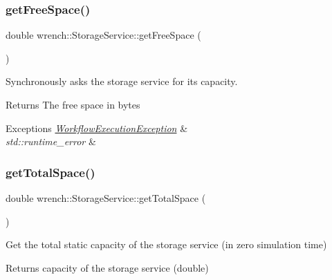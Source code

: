 \subsubsection{\texorpdfstring{get\+Free\+Space()}{getFreeSpace()}}
{\footnotesize\ttfamily double wrench\+::\+Storage\+Service\+::get\+Free\+Space (\begin{DoxyParamCaption}{ }\end{DoxyParamCaption})\hspace{0.3cm}{\ttfamily [virtual]}}



Synchronously asks the storage service for its capacity. 

\begin{DoxyReturn}{Returns}
The free space in bytes
\end{DoxyReturn}

\begin{DoxyExceptions}{Exceptions}
{\em \hyperlink{classwrench_1_1_workflow_execution_exception}{Workflow\+Execution\+Exception}} & \\
\hline
{\em std\+::runtime\+\_\+error} & \\
\hline
\end{DoxyExceptions}
\mbox{\label{classwrench_1_1_storage_service_a0ea24bcd9b320bde776b64dd8e4cd494}} 
\subsubsection{\texorpdfstring{get\+Total\+Space()}{getTotalSpace()}}
{\footnotesize\ttfamily double wrench\+::\+Storage\+Service\+::get\+Total\+Space (\begin{DoxyParamCaption}{ }\end{DoxyParamCaption})}



Get the total static capacity of the storage service (in zero simulation time) 

\begin{DoxyReturn}{Returns}
capacity of the storage service (double) 
\end{DoxyReturn}
\mbox{\label{classwrench_1_1_storage_service_a09b05865c81f22295720776e5952ffd4}} 
